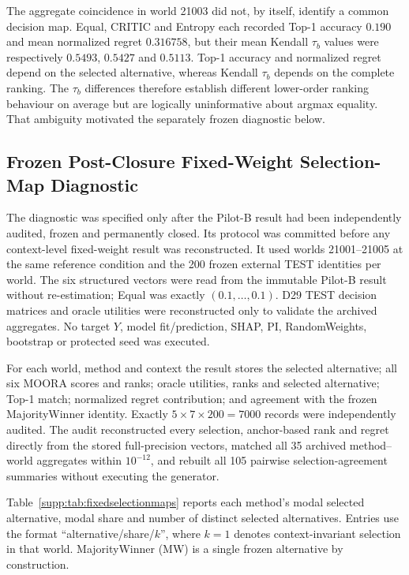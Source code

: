 \documentclass[runningheads]{llncs}
\begin{document}
The aggregate coincidence in world 21003 did not, by itself, identify a common decision map.
Equal, CRITIC and Entropy each recorded Top-1 accuracy $0.190$ and mean normalized regret
$0.316758$, but their mean Kendall $\tau_b$ values were respectively $0.5493$, $0.5427$ and
$0.5113$. Top-1 accuracy and normalized regret depend on the selected alternative, whereas
Kendall $\tau_b$ depends on the complete ranking. The $\tau_b$ differences therefore establish
different lower-order ranking behaviour on average but are logically uninformative about
argmax equality. That ambiguity motivated the separately frozen diagnostic below.

\subsection{Frozen Post-Closure Fixed-Weight Selection-Map Diagnostic}
\label{supp:sec:fixedselection}

The diagnostic was specified only after the Pilot-B result had been independently audited,
frozen and permanently closed. Its protocol was committed before any context-level
fixed-weight result was reconstructed. It used worlds 21001--21005 at the same reference
condition and the 200 frozen external TEST identities per world. The six structured vectors
were read from the immutable Pilot-B result without re-estimation; Equal was exactly
$(0.1,\ldots,0.1)$. D29 TEST decision matrices and oracle utilities were reconstructed only to
validate the archived aggregates. No target $Y$, model fit/prediction, SHAP, PI, RandomWeights,
bootstrap or protected seed was executed.

For each world, method and context the result stores the selected alternative; all six MOORA
scores and ranks; oracle utilities, ranks and selected alternative; Top-1 match; normalized
regret contribution; and agreement with the frozen MajorityWinner identity. Exactly
$5\times7\times200=7000$ records were independently audited. The audit reconstructed every
selection, anchor-based rank and regret directly from the stored full-precision vectors,
matched all 35 archived method--world aggregates within $10^{-12}$, and rebuilt all 105
pairwise selection-agreement summaries without executing the generator.

Table~\ref{supp:tab:fixedselectionmaps} reports each method's modal selected alternative,
modal share and number of distinct selected alternatives. Entries use the format
``alternative/share/$k$'', where $k=1$ denotes context-invariant selection in that world.
MajorityWinner (MW) is a single frozen alternative by construction.
\end{document}
